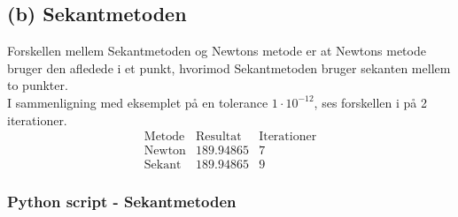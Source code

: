 \subsection*{(b) Sekantmetoden}
%
Forskellen mellem Sekantmetoden og Newtons metode er at Newtons metode bruger den afledede i et punkt, hvorimod Sekantmetoden bruger sekanten mellem to punkter. \\
I sammenligning med eksemplet på en tolerance $1\cdot10^{-12}$, ses forskellen i på 2 iterationer. 
%
$$\begin{array}{l|c|c}
\text{Metode} & \text{Resultat} & \text{Iterationer}\\
\hline
\text{Newton}		& 189.94865 & 7\\
\text{Sekant}		& 189.94865 & 9
\end{array}$$
%
\subsubsection*{Python script - Sekantmetoden}
%

\phantom{matematik}